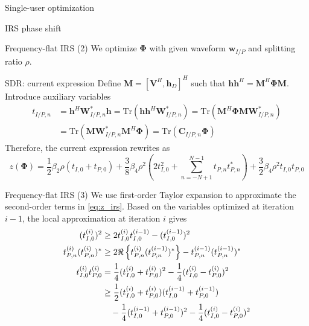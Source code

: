\documentclass[9pt]{beamer}
\begin{document}
\begin{section}{Single-user optimization}
\begin{subsection}{IRS phase shift}
		\begin{frame}{Frequency-flat IRS (2)}
			We optimize $\boldsymbol{\Phi}$ with given waveform $\boldsymbol{w}_{I/P}$ and splitting ratio $\rho$.
			\begin{block}{SDR: current expression}
				Define $\boldsymbol{M}=[\boldsymbol{V}^H,\boldsymbol{h}_D]^H$ such that $\boldsymbol{h}\boldsymbol{h}^H=\boldsymbol{M}^H\boldsymbol{\Phi}\boldsymbol{M}$. Introduce auxiliary variables
				\begin{equation}\label{eq:t}
					\begin{split}
						t_{I/P,n}
						&=\boldsymbol{h}^H\boldsymbol{W}_{I/P,n}^*\boldsymbol{h}=\mathrm{Tr}(\boldsymbol{h}\boldsymbol{h}^H\boldsymbol{W}_{I/P,n}^*)=\mathrm{Tr}(\boldsymbol{M}^H\boldsymbol{\Phi}\boldsymbol{M}\boldsymbol{W}_{I/P,n}^*)\\
						&=\mathrm{Tr}(\boldsymbol{M}\boldsymbol{W}_{I/P,n}^*\boldsymbol{M}^H\boldsymbol{\Phi})=\mathrm{Tr}(\boldsymbol{C}_{I/P,n}\boldsymbol{\Phi})
					\end{split}
				\end{equation}
				Therefore, the current expression rewrites as
				\begin{equation}\label{eq:z_irs}
					z(\boldsymbol{\Phi})=\frac{1}{2}{\beta_2}{\rho}(t_{I,0}+t_{P,0})+\frac{3}{8}{\beta_4}{\rho^2} \left(2t_{I,0}^2 + \sum_{n=-N+1}^{N-1}{t_{P,n}t_{P,n}^*}\right)+\frac{3}{2}{\beta_4}{\rho^2}t_{I,0}t_{P,0}
				\end{equation}
			\end{block}
		\end{frame}

		\begin{frame}{Frequency-flat IRS (3)}
			We use first-order Taylor expansion to approximate the second-order terms in \ref{eq:z_irs}. Based on the variables optimized at iteration $i - 1$, the local approximation at iteration $i$ gives
			\begin{align}
				(t_{I,0}^{(i)})^2
				& \ge 2 t_{I,0}^{(i)}t_{I,0}^{(i-1)} - (t_{I,0}^{(i-1)})^2\label{eq:t_{I,0}_square}\\
				t_{P,n}^{(i)} (t_{P,n}^{(i)})^*
				& \ge 2 \Re\left\{t_{P,n}^{(i)} (t_{P,n}^{(i-1)})^*\right\} - t_{P,n}^{(i-1)} (t_{P,n}^{(i-1)})^*\\
				t_{I,0}^{(i)} t_{P,0}^{(i)}
				& = \frac{1}{4}(t_{I,0}^{(i)} + t_{P,0}^{(i)})^2 - \frac{1}{4}(t_{I,0}^{(i)} - t_{P,0}^{(i)})^2\nonumber\\
				& \ge \frac{1}{2}(t_{I,0}^{(i)} + t_{P,0}^{(i)})(t_{I,0}^{(i-1)} + t_{P,0}^{(i-1)})\nonumber\\
				& \quad - \frac{1}{4}(t_{I,0}^{(i-1)} + t_{P,0}^{(i-1)})^2 - \frac{1}{4}(t_{I,0}^{(i)} - t_{P,0}^{(i)})^2\label{eq:t_{I/P,0}}
			\end{align}
		\end{frame}


\end{subsection}
\end{section}
\end{document}
